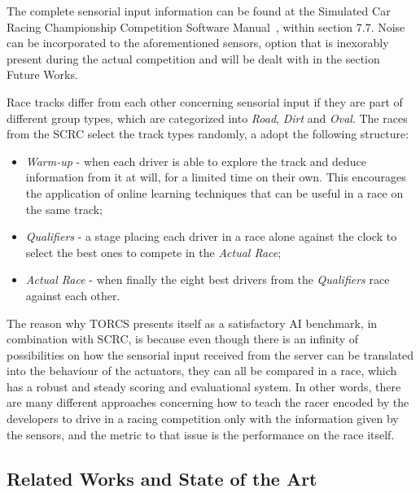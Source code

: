 	The complete sensorial input information can be found at the Simulated Car Racing Championship Competition
	Software Manual~\cite{SCRC}, within section 7.7. Noise can be incorporated to the aforementioned sensors,
	option that is inexorably present during the actual competition and will be dealt with in the section Future
	Works.

	Race tracks differ from each other concerning sensorial input if they are part of different group types, which
	are categorized into \emph{Road}, \emph{Dirt} and \emph{Oval}. The races from the SCRC select the track types
	randomly, a adopt the following structure:
	
		\begin{itemize}
			
			\item \emph{Warm-up} - when each driver is able to explore the track and deduce information from it	at
			will, for a limited time on their own. This encourages the application of online learning techniques
			that can be useful in a race on the same track;
			
			\item \emph{Qualifiers} - a stage placing each driver in a race alone against the clock to select the best
			ones to compete in the \emph{Actual Race};
			
			\item \emph{Actual Race} - when finally the eight best drivers from the \emph{Qualifiers} race against
			each other.
			
		\end{itemize}
	
	The reason why TORCS presents itself as a satisfactory AI benchmark, in combination with SCRC, is because even
	though there is an infinity of possibilities on how the sensorial input received from the server can be
	translated into the behaviour of the actuators, they can all be compared in a race, which has a robust and steady
	scoring and evaluational system. In other words, there are many different approaches concerning how to teach the
	racer encoded by the developers to drive in a racing competition only with the information given by the sensors,
	and the metric to that issue is the performance on the race itself.

\subsection{Related Works and State of the Art} \label{subsec:Related}
	
